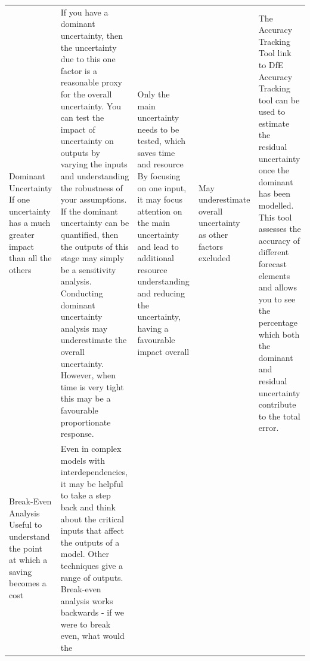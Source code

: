 \documentclass[]{book}
\begin{document}
\begin{longtable}[]{@{}lllll@{}}
\begin{minipage}[t]{0.16\columnwidth}
Dominant Uncertainty If one uncertainty has a much greater impact than
all the others\strut
\end{minipage} & \begin{minipage}[t]{0.26\columnwidth}\raggedright\strut
If you have a dominant uncertainty, then the uncertainty due to this one
factor is a reasonable proxy for the overall uncertainty. You can test
the impact of uncertainty on outputs by varying the inputs and
understanding the robustness of your assumptions. If the dominant
uncertainty can be quantified, then the outputs of this stage may simply
be a sensitivity analysis. Conducting dominant uncertainty analysis may
underestimate the overall uncertainty. However, when time is very tight
this may be a favourable proportionate response.\strut
\end{minipage} & \begin{minipage}[t]{0.16\columnwidth}\raggedright\strut
Only the main uncertainty needs to be tested, which saves time and
resource By focusing on one input, it may focus attention on the main
uncertainty and lead to additional resource understanding and reducing
the uncertainty, having a favourable impact overall\strut
\end{minipage} & \begin{minipage}[t]{0.16\columnwidth}\raggedright\strut
May underestimate overall uncertainty as other factors excluded\strut
\end{minipage} & \begin{minipage}[t]{0.13\columnwidth}\raggedright\strut
The Accuracy Tracking Tool link to DfE Accuracy Tracking tool can be
used to estimate the residual uncertainty once the dominant has been
modelled. This tool assesses the accuracy of different forecast elements
and allows you to see the percentage which both the dominant and
residual uncertainty contribute to the total error.\strut
\end{minipage}\tabularnewline
\begin{minipage}[t]{0.16\columnwidth}\raggedright\strut
Break-Even Analysis Useful to understand the point at which a saving
becomes a cost\strut
\end{minipage} & \begin{minipage}[t]{0.26\columnwidth}\raggedright\strut
Even in complex models with interdependencies, it may be helpful to take
a step back and think about the critical inputs that affect the outputs
of a model. Other techniques give a range of outputs. Break-even
analysis works backwards - if we were to break even, what would the

\end{minipage}
\end{longtable}
\end{document}
